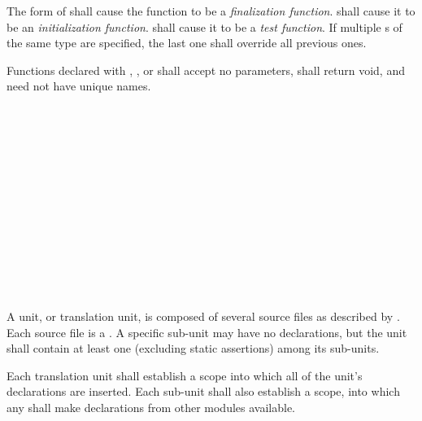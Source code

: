 \specsubsubitem
The  form of  shall cause the
function to be a \textit{finalization function}.  shall cause it
to be an \textit{initialization function}.  shall cause it to be
a \textit{test function}. If multiple s of the same type
are specified, the last one shall override all previous ones.

\specsubsubitem
Functions declared with , , or 
shall accept no parameters, shall return void, and need not have unique names.


\begin{grammar}
\\
	 \\

\\
	 \\

\\
	  \terminal{;}\\
	  \terminal{=}  \terminal{;}\\
	  \terminal{::} \terminal{\{}  \terminal{\}} \terminal{;}\\
	  \terminal{::} \terminal{*} \terminal{;}\\

\\
	 \optional{\terminal{,}}\\
	 \terminal{,} \\
\end{grammar}

\specsubitem
A unit, or translation unit, is composed of several source files as described
by . Each source file is a .
A specific sub-unit may have no declarations, but the unit shall contain at
least one  (excluding static assertions) among its
sub-units.

\specsubitem
Each translation unit shall establish a scope into which all of the unit's
declarations are inserted. Each sub-unit shall also establish a scope, into
which any  shall make declarations from other modules
available.


